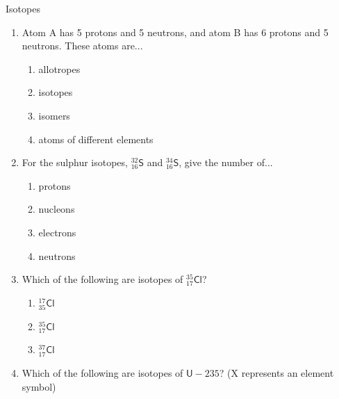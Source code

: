    \begin{exercises}  {Isotopes }
            \nopagebreak
        \label{m38753*id258162}\begin{enumerate}[noitemsep, label=\textbf{\arabic*}. ] 
            \label{m38753*uid50}\item Atom A has 5 protons and 5 neutrons, and atom B has 6 protons and 5 neutrons. These atoms are...
\label{m38753*id258178}\begin{enumerate}[noitemsep, label=\textbf{\alph*}. ] 
            \label{m38753*uid51}\item allotropes
\label{m38753*uid52}\item isotopes
\label{m38753*uid53}\item isomers
\label{m38753*uid54}\item atoms of different elements
\end{enumerate}
                \label{m38753*uid55}\item For the sulphur isotopes, $_{16}^{32}\mathsf{S}$ and $_{16}^{34}\mathsf{S}$, give the number of...
\label{m38753*id258277}\begin{enumerate}[noitemsep, label=\textbf{\alph*}. ] 
            \label{m38753*uid56}\item protons
\label{m38753*uid57}\item nucleons
\label{m38753*uid58}\item electrons
\label{m38753*uid59}\item neutrons
\end{enumerate}
                \label{m38753*uid60}\item Which of the following are isotopes of $_{17}^{35}\mathsf{Cl}$?
\label{m38753*id258355}\begin{enumerate}[noitemsep, label=\textbf{\alph*}. ] 
            \label{m38753*uid61}\item $_{35}^{17}\mathsf{Cl}$
\label{m38753*uid62}\item $_{17}^{35}\mathsf{Cl}$
\label{m38753*uid63}\item $_{17}^{37}\mathsf{Cl}$
\end{enumerate}
                \label{m38753*uid64}\item Which of the following are isotopes of $\mathsf{U-}235$? (X represents an element symbol)

\end{enumerate}
\end{exercises}
